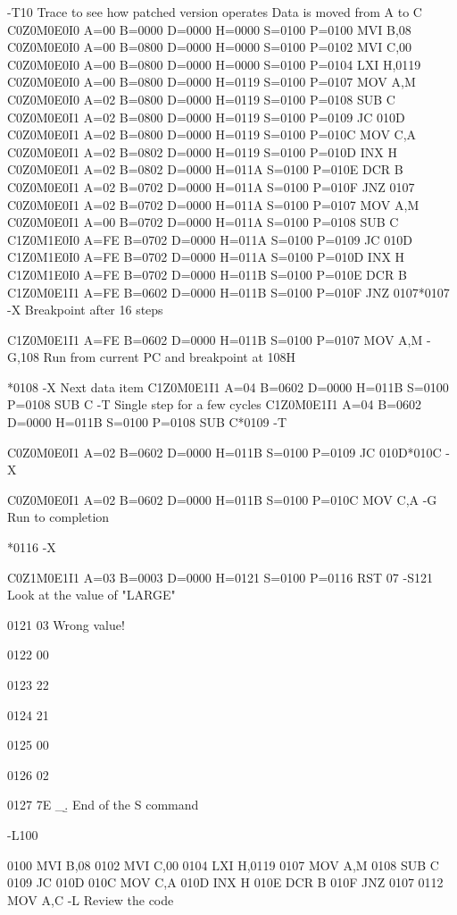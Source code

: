 -T10
     Trace to see how patched version operates    Data is moved from A to C
C0Z0M0E0I0 A=00 B=0000 D=0000 H=0000 S=0100 P=0100 MVI B,08
C0Z0M0E0I0 A=00 B=0800 D=0000 H=0000 S=0100 P=0102 MVI C,00
C0Z0M0E0I0 A=00 B=0800 D=0000 H=0000 S=0100 P=0104 LXI H,0119
C0Z0M0E0I0 A=00 B=0800 D=0000 H=0119 S=0100 P=0107 MOV A,M
C0Z0M0E0I0 A=02 B=0800 D=0000 H=0119 S=0100 P=0108 SUB C
C0Z0M0E0I1 A=02 B=0800 D=0000 H=0119 S=0100 P=0109 JC  010D
C0Z0M0E0I1 A=02 B=0800 D=0000 H=0119 S=0100 P=010C MOV C,A
C0Z0M0E0I1 A=02 B=0802 D=0000 H=0119 S=0100 P=010D INX H
C0Z0M0E0I1 A=02 B=0802 D=0000 H=011A S=0100 P=010E DCR B
C0Z0M0E0I1 A=02 B=0702 D=0000 H=011A S=0100 P=010F JNZ 0107
C0Z0M0E0I1 A=02 B=0702 D=0000 H=011A S=0100 P=0107 MOV A,M
C0Z0M0E0I1 A=00 B=0702 D=0000 H=011A S=0100 P=0108 SUB C
C1Z0M1E0I0 A=FE B=0702 D=0000 H=011A S=0100 P=0109 JC  010D
C1Z0M1E0I0 A=FE B=0702 D=0000 H=011A S=0100 P=010D INX H
C1Z0M1E0I0 A=FE B=0702 D=0000 H=011B S=0100 P=010E DCR B
C1Z0M0E1I1 A=FE B=0602 D=0000 H=011B S=0100 P=010F JNZ 0107*0107
-X                                  Breakpoint after 16 steps

C1Z0M0E1I1 A=FE B=0602 D=0000 H=011B S=0100 P=0107 MOV A,M
-G,108   Run from current PC and breakpoint at 108H

*0108
-X
                Next data item
C1Z0M0E1I1 A=04 B=0602 D=0000 H=011B S=0100 P=0108 SUB C
-T
    Single step for a few cycles
C1Z0M0E1I1 A=04 B=0602 D=0000 H=011B S=0100 P=0108 SUB C*0109
-T

C0Z0M0E0I1 A=02 B=0602 D=0000 H=011B S=0100 P=0109 JC 010D*010C
-X

C0Z0M0E0I1 A=02 B=0602 D=0000 H=011B S=0100 P=010C MOV C,A
-G   Run to completion

*0116
-X

C0Z1M0E1I1 A=03 B=0003 D=0000 H=0121 S=0100 P=0116 RST 07
-S121   Look at the value of "LARGE"

 0121   03   Wrong value!

 0122   00

 0123   22

 0124   21

 0125   00

 0126   02
  
 0127   7E  _\b.    End of the S command

-L100

 0100   MVI        B,08
 0102   MVI        C,00
 0104   LXI        H,0119
 0107   MOV        A,M
 0108   SUB        C
 0109   JC         010D
 010C   MOV        C,A
 010D   INX        H
 010E   DCR        B
 010F   JNZ        0107
 0112   MOV        A,C
-L                            Review the code

